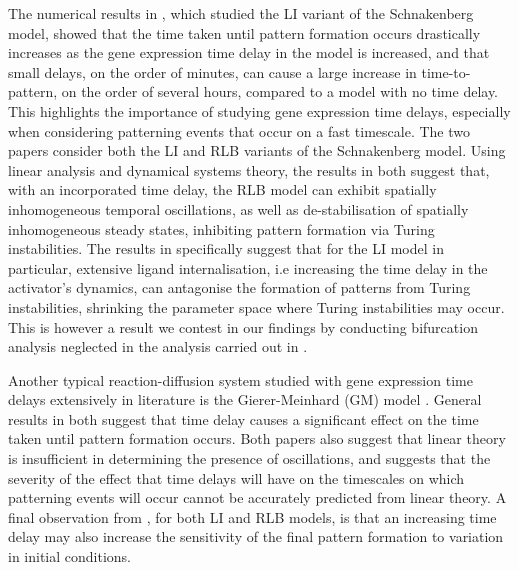 The numerical results in \cite{gaffmonk}, which studied the LI variant of the Schnakenberg model, showed that the time taken until pattern formation occurs drastically increases as the gene expression time delay in the model is increased, and that small delays, on the order of minutes, can cause a large increase in time-to-pattern, on the order of several hours, compared to a model with no time delay. This highlights the importance of studying gene expression time delays, especially when considering patterning events that occur on a fast timescale. The two papers \cite{jiang, yigaffneyli} consider both the LI and RLB variants of the Schnakenberg model. Using linear analysis and dynamical systems theory, the results in both suggest that, with an incorporated time delay, the RLB model can exhibit spatially inhomogeneous temporal oscillations, as well as de-stabilisation of spatially inhomogeneous steady states, inhibiting pattern formation via Turing instabilities. The results in \cite{yigaffneyli}  specifically suggest that for the LI model in particular, extensive ligand internalisation, i.e increasing the time delay in the activator's dynamics, can antagonise the formation of patterns from Turing instabilities, shrinking the parameter space where Turing instabilities may occur. This is however a result we contest in our findings by conducting bifurcation analysis neglected in the analysis carried out in \cite{yigaffneyli}.

Another typical reaction-diffusion system studied with gene expression time delays extensively in literature is the Gierer-Meinhard (GM) model \cite{gm}. General results in both \cite{leegaffney,leegaffmonk} suggest that time delay causes a significant effect on the time taken until pattern formation occurs. Both papers also suggest that linear theory is insufficient in determining the presence of oscillations, and \cite{leegaffmonk} suggests that the severity of the effect that time delays will have on the timescales on which patterning events will occur cannot be accurately predicted from linear theory. A final observation from \cite{gaffmonk,leegaffmonk}, for both LI and RLB models, is that an increasing time delay may also increase the sensitivity of the final pattern formation to variation in initial conditions.

